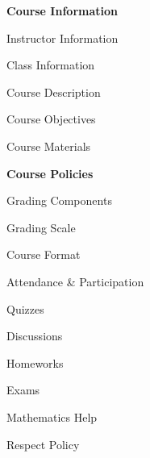 \documentclass[11pt,letterpaper]{article}
\begin{document}
\mytitle




\begin{minipage}[t]{0.45\textwidth}
{\bfseries\color{stacred} Course Information} \dotfill \pageref{course_info} \par
\hspace{0.3cm} Instructor Information \dotfill \pageref{instr_info} \par
\hspace{0.3cm} Class Information \dotfill \pageref{class_info} \par
\hspace{0.3cm} Course Description \dotfill \pageref{course_desc} \par
\hspace{0.3cm} Course Objectives \dotfill \pageref{course_obj} \par
\hspace{0.3cm} Course Materials \dotfill \pageref{course_mat} \par
{\bfseries\color{stacred} Course Policies} \dotfill \pageref{course_polc} \par
\hspace{0.3cm} Grading Components \dotfill \pageref{grade_comp} \par
\hspace{0.3cm} Grading Scale \dotfill \pageref{grade_scale} \par
\hspace{0.3cm} Course Format \dotfill \pageref{course_form} \par
\hspace{0.3cm} Attendance \& Participation \dotfill \pageref{attend} \par
\hspace{0.3cm} Quizzes \dotfill \pageref{quiz} \par
\hspace{0.3cm} Discussions \dotfill \pageref{discussions} \par
\hspace{0.3cm} Homeworks \dotfill \pageref{hw} \par
\hspace{0.3cm} Exams \dotfill \pageref{exams} \par
\hspace{0.3cm} Mathematics Help \dotfill \pageref{help} \par
\hspace{0.3cm} Respect Policy \dotfill \pageref{respect} \par

\end{minipage}
\end{document}
